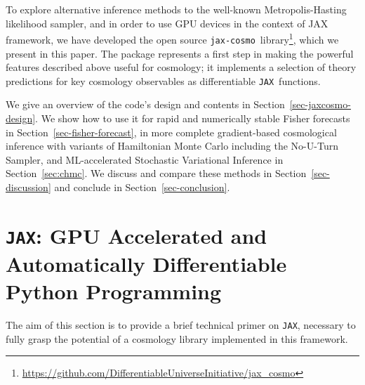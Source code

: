 \documentclass[twocolumn,twocolappendix,nofootinbib,iop]{openjournal}
\newcommand{\FrL}[1]{{\color{cyan}FL: #1}}
\newcommand{\jaxcosmo}{\texttt{jax-cosmo}}
\newcommand{\jax}{\texttt{JAX}}
\begin{document}

To explore alternative inference methods to the well-known Metropolis-Hasting likelihood sampler, and in order to use GPU devices in the context of JAX framework, we have developed the open source \jaxcosmo\ library\footnote{\url{https://github.com/DifferentiableUniverseInitiative/jax_cosmo}}, which we present in this paper. The package represents a first step in making the powerful features described above useful for cosmology; it implements a selection of theory predictions for key cosmology observables as differentiable \jax\ functions.




We give an overview of the code's design and contents in Section~\ref{sec-jaxcosmo-design}. We show how to use it for rapid and numerically stable Fisher forecasts in Section~\ref{sec-fisher-forecast}, in more complete gradient-based cosmological inference with variants of Hamiltonian Monte Carlo including the No-U-Turn Sampler, and ML-accelerated Stochastic Variational Inference in Section~\ref{sec:chmc}. We discuss and compare these methods in Section~\ref{sec-discussion} and conclude in Section~\ref{sec-conclusion}.



\section{\jax: GPU Accelerated and Automatically Differentiable Python Programming}
\label{sec-primer}

The aim of this section is to provide a brief technical primer on \jax, necessary to fully grasp the potential of a cosmology library implemented in this framework.

\end{document}
